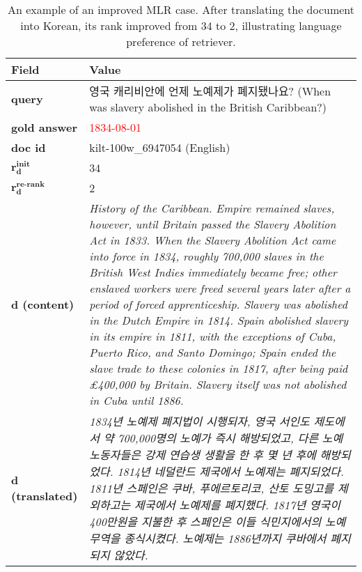 \begin{table*}[ht]
\centering
\begin{tabularx}{\textwidth}{lX}
\hline
\textbf{Field} & \textbf{Value} \\
\hline
\textbf{query} & 영국 캐리비안에 언제 노예제가 폐지됐나요? (When was slavery abolished in the British Caribbean?) \\
\hline
\textbf{gold answer} & \textcolor{red}{1834-08-01} \\
\hline
\textbf{doc id} & kilt-100w\_6947054 (English) \\
\hline
\(\mathbf{r_d^{\text{init}}}\) & 34 \\
\hline
\(\mathbf{r_d^{\text{re-rank}}}\) & 2 \\
\hline
\textbf{d (content)} & \textit{History of the Caribbean. Empire remained slaves, however, until Britain passed the Slavery Abolition Act in 1833. 
When the Slavery Abolition Act came into force in 1834, roughly 700,000 slaves in the British West Indies immediately became free; 
other enslaved workers were freed several years later after a period of forced apprenticeship. 
Slavery was abolished in the Dutch Empire in 1814. 
Spain abolished slavery in its empire in 1811, with the exceptions of Cuba, Puerto Rico, and Santo Domingo; 
Spain ended the slave trade to these colonies in 1817, after being paid ₤400,000 by Britain. 
Slavery itself was not abolished in Cuba until 1886.} \\
\hline
\textbf{d (translated)} & \textit{1834년 노예제 폐지법이 시행되자, 영국 서인도 제도에서 약 700,000명의 노예가 즉시 해방되었고, 
다른 노예 노동자들은 강제 연습생 생활을 한 후 몇 년 후에 해방되었다. 
1814년 네덜란드 제국에서 노예제는 폐지되었다. 
1811년 스페인은 쿠바, 푸에르토리코, 산토 도밍고를 제외하고는 제국에서 노예제를 폐지했다. 
1817년 영국이 400만원을 지불한 후 스페인은 이들 식민지에서의 노예 무역을 종식시켰다. 
노예제는 1886년까지 쿠바에서 폐지되지 않았다.} \\
\hline
\end{tabularx}
\caption{An example of an improved MLR case. After translating the document into Korean, its rank improved from 34 to 2, illustrating language preference of retriever.}
\label{tab:case_mlr}
\end{table*}
